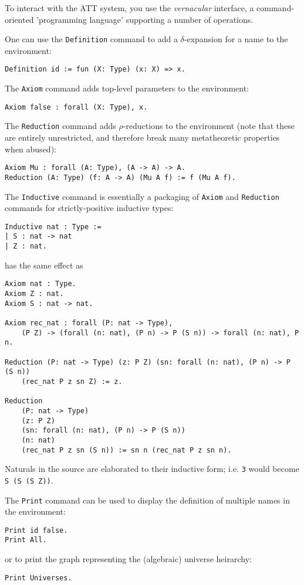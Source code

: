 \documentclass{article}
\begin{document}
To interact with the ATT system, you use the \emph{vernacular} interface, a command-oriented 'programming language' supporting a number of operations.

One can use the \texttt{Definition} command to add a $\delta$-expansion for a name to the environment:
\begin{lstlisting}
Definition id := fun (X: Type) (x: X) => x.
\end{lstlisting}

The \texttt{Axiom} command adds top-level parameters to the environment:
\begin{lstlisting}
Axiom false : forall (X: Type), x.
\end{lstlisting}

The \texttt{Reduction} command adds $\rho$-reductions to the environment (note that these are entirely unrestricted, and therefore break many metatheoretic properties when abused):
\begin{lstlisting}
Axiom Mu : forall (A: Type), (A -> A) -> A.
Reduction (A: Type) (f: A -> A) (Mu A f) := f (Mu A f).
\end{lstlisting}

The \texttt{Inductive} command is essentially a packaging of \texttt{Axiom} and \texttt{Reduction} commands for strictly-positive inductive types:
\begin{lstlisting}
Inductive nat : Type :=
| S : nat -> nat
| Z : nat.
\end{lstlisting}
has the same effect as
\begin{lstlisting}
Axiom nat : Type.
Axiom Z : nat.
Axiom S : nat -> nat.

Axiom rec_nat : forall (P: nat -> Type),
    (P Z) -> (forall (n: nat), (P n) -> P (S n)) -> forall (n: nat), P n.

Reduction (P: nat -> Type) (z: P Z) (sn: forall (n: nat), (P n) -> P (S n))
    (rec_nat P z sn Z) := z.

Reduction
    (P: nat -> Type)
    (z: P Z)
    (sn: forall (n: nat), (P n) -> P (S n))
    (n: nat)
    (rec_nat P z sn (S n)) := sn n (rec_nat P z sn n).
\end{lstlisting}
Naturals in the source are elaborated to their inductive form; i.e. \texttt{3} would become \texttt{S (S (S Z))}.

The \texttt{Print} command can be used to display the definition of multiple names in the environment:
\begin{lstlisting}
Print id false.
Print All.
\end{lstlisting}
or to print the graph representing the (algebraic) universe heirarchy:
\begin{lstlisting}
Print Universes.
\end{lstlisting}
\end{document}

